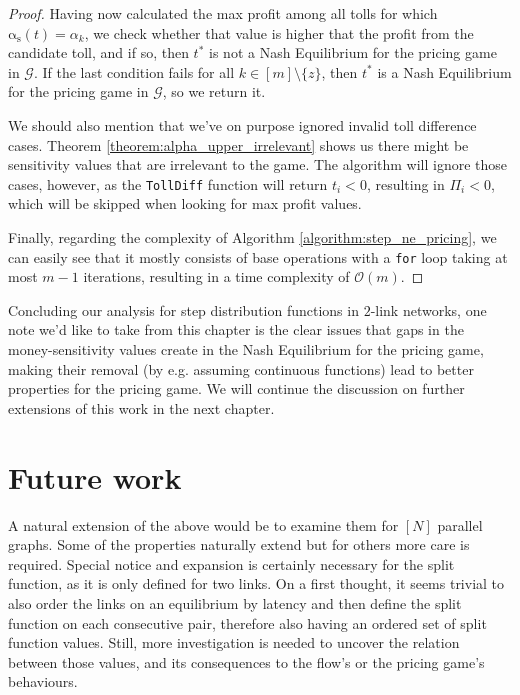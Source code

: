 \documentclass[10pt,a4paper]{book}
\newcommand{\as}{\mathrm{\alpha_s}}
\newcommand{\Gm}{\mathcal{G}}
\theoremstyle{definition}
\theoremstyle{comment}
\begin{document}
\begin{proof}
	Having now calculated the max profit among all tolls for which $\as(t) = \alpha_k$, we check whether that value is higher that the profit from the candidate toll, and if so, then $t^*$ is not a Nash Equilibrium for the pricing game in $\Gm$.
	If the last condition fails for all $k \in [m] \setminus \{z\}$, then $t^*$ is a Nash Equilibrium for the pricing game in $\Gm$, so we return it.

	We should also mention that we've on purpose ignored invalid toll difference cases.
	Theorem \ref{theorem:alpha_upper_irrelevant} shows us there might be sensitivity values that are irrelevant to the game.
	The algorithm will ignore those cases, however, as the \texttt{TollDiff} function will return $t_i < 0$, resulting in $\Pi_i < 0$, which will be skipped when looking for max profit values.

	Finally, regarding the complexity of Algorithm \ref{algorithm:step_ne_pricing}, we can easily see that it mostly consists of base operations with a \texttt{for} loop taking at most $m - 1$ iterations, resulting in a time complexity of $\mathcal{O}(m)$.
\end{proof}

Concluding our analysis for step distribution functions in $2$-link networks, one note we'd like to take from this chapter is the clear issues that gaps in the money-sensitivity values create in the Nash Equilibrium for the pricing game, making their removal (by e.g. assuming continuous functions) lead to better properties for the pricing game.
We will continue the discussion on further extensions of this work in the next chapter.

\cleardoublepage


\chapter{Future work}
\label{chapter:future_work}

A natural extension of the above would be to examine them for $[N]$ parallel graphs.
Some of the properties naturally extend but for others more care is required.
Special notice and expansion is certainly necessary for the split function, as it is only defined for two links.
On a first thought, it seems trivial to also order the links on an equilibrium by latency and then define the split function on each consecutive pair, therefore also having an ordered set of split function values.
Still, more investigation is needed to uncover the relation between those values, and its consequences to the flow's or the pricing game's behaviours.
\end{document}
